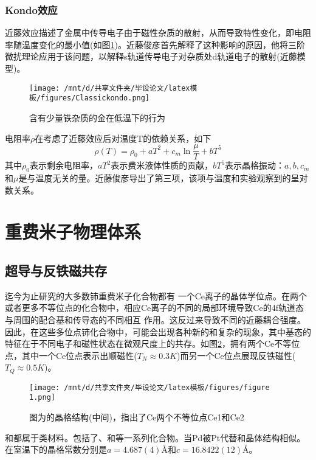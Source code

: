 \subsubsection{Kondo效应}
近藤效应描述了金属中传导电子由于磁性杂质的散射，从而导致特性变化，即电阻率随温度变化的最小值(如图\ref{fig})。近藤俊彦首先解释了这种影响的原因，他将三阶微扰理论应用于该问题，以解释s轨道传导电子对杂质处d轨道电子的散射(近藤模型)。
\begin{figure}[h]
    \centering
    \texttt{[image: /mnt/d/共享文件夹/毕设论文/latex模板/figures/Classickondo.png]}
    \caption{含有少量铁杂质的金在低温下的行为}
    \label{fig}
\end{figure}
电阻率$\rho$在考虑了近藤效应后对温度T的依赖关系，如下
$$
\rho(T)=\rho_{0}+a T^{2}+c_{m} \ln \frac{\mu}{T}+b T^{5}
$$
其中$\rho_0$表示剩余电阻率，$aT^2$表示费米液体性质的贡献，$bT^5$表示晶格振动：$a,b,c_m$和$\mu$是与温度无关的量。近藤俊彦导出了第三项，该项与温度和实验观察到的呈对数关系。





\section{重费米子物理体系}
\subsection{超导与反铁磁共存}
迄今为止研究的大多数铈重费米子化合物都有 一个Ce离子的晶体学位点。在两个或者更多不等位点的化合物中，相应Ce离子的不同的局部环境导致Ce的4f轨道态与周围的配合基和传导态的不同相互 作用。这反过来导致不同的近藤耦合强度。因此，在这些多位点铈化合物中，可能会出现各种新的和复杂的现象，其中基态的特征在于不同电子和磁性状态在微观尺度上的共存。如图\ref{fig1}，拥有两个Ce不等位点，其中一个Ce位点表示出顺磁性($T_N \approx 0.3K$)而另一个Ce位点展现反铁磁性($T_Q \approx 0.5K$)。

\begin{figure}[h]
    \centering
    \texttt{[image: /mnt/d/共享文件夹/毕设论文/latex模板/figures/figure 1.png]}
    \caption{\Songti 图为的晶格结构(中间)，指出了Ce两个不等位点Ce1和Ce2}
    \label{fig1}
\end{figure}


和都属于类材料。包括了、和等一系列化合物。当Pd被Pt代替和晶体结构相似。在室温下的晶格常数分别是$a=4.687(4)$\AA 和$c=16.8422(12)$\AA。

